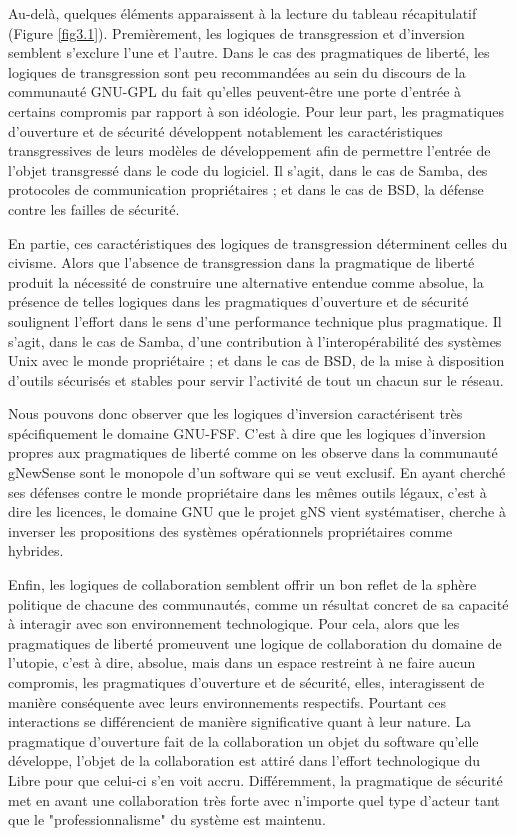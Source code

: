 Au-delà, quelques éléments apparaissent à la lecture du tableau récapitulatif (Figure \ref{fig3.1}). Premièrement, les logiques de transgression et d'inversion semblent s'exclure l'une et l'autre. Dans le cas des pragmatiques de liberté, les logiques de transgression sont peu recommandées au sein du discours de la communauté GNU-GPL du fait qu'elles peuvent-être une porte  d'entrée à certains compromis par rapport à son idéologie. Pour leur part, les pragmatiques d'ouverture et de sécurité développent notablement les caractéristiques transgressives de leurs modèles de développement afin de permettre l'entrée de l'objet transgressé dans le code du logiciel. Il s'agit, dans le cas de Samba, des protocoles de communication propriétaires ; et dans le cas de BSD, la défense contre les failles de sécurité.

En partie, ces caractéristiques des logiques de transgression déterminent celles du civisme. Alors que l'absence de transgression dans la pragmatique de liberté produit la nécessité de construire une alternative entendue comme absolue, la présence de telles logiques dans les pragmatiques d'ouverture et de sécurité soulignent l'effort dans le sens d'une performance technique plus pragmatique. Il s'agit, dans le cas de Samba, d'une contribution à l'interopérabilité des systèmes Unix avec le monde propriétaire ; et dans le cas de BSD, de la mise à disposition d'outils sécurisés et stables pour servir l'activité de tout un chacun sur le réseau.

Nous pouvons donc observer que les logiques d'inversion caractérisent très spécifiquement le domaine GNU-FSF. C'est à dire que les logiques d'inversion propres aux pragmatiques de liberté comme on les observe dans la communauté gNewSense sont le monopole d'un software qui se veut exclusif. En ayant cherché ses défenses contre le monde propriétaire dans les mêmes outils légaux, c'est à dire les licences, le domaine GNU que le projet gNS vient systématiser, cherche à inverser les propositions des systèmes opérationnels propriétaires comme hybrides.

Enfin, les logiques de collaboration semblent offrir un bon reflet de la sphère politique de chacune des communautés, comme un résultat concret de sa capacité à interagir avec son environnement technologique. Pour cela, alors que les pragmatiques de liberté promeuvent une logique de collaboration du domaine de l'utopie, c'est à dire, absolue, mais dans un espace restreint à ne faire aucun compromis, les pragmatiques d'ouverture et de sécurité, elles, interagissent de manière conséquente avec leurs environnements respectifs. Pourtant ces interactions se différencient de manière significative quant à leur nature. La pragmatique d'ouverture fait de la collaboration un objet du software qu'elle développe, l'objet de la collaboration est attiré dans l'effort technologique du Libre pour que celui-ci s'en voit accru. Différemment, la pragmatique de sécurité met en avant une collaboration très forte avec n'importe quel type d'acteur tant que le "professionnalisme" du système est maintenu.

